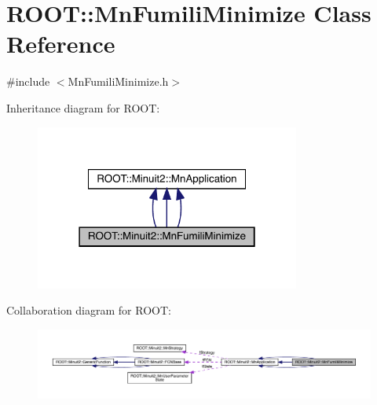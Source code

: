 \hypertarget{classROOT_1_1Minuit2_1_1MnFumiliMinimize}{}\section{R\+O\+OT\+:\+:Mn\+Fumili\+Minimize Class Reference}
\label{classROOT_1_1Minuit2_1_1MnFumiliMinimize}


{\ttfamily \#include $<$Mn\+Fumili\+Minimize.\+h$>$}



Inheritance diagram for R\+O\+OT\+:
\nopagebreak
\begin{figure}[H]
\begin{center}
\leavevmode
\includegraphics[width=247pt]{d2/d78/classROOT_1_1Minuit2_1_1MnFumiliMinimize__inherit__graph}
\end{center}
\end{figure}


Collaboration diagram for R\+O\+OT\+:
\nopagebreak
\begin{figure}[H]
\begin{center}
\leavevmode
\includegraphics[width=350pt]{dd/dcd/classROOT_1_1Minuit2_1_1MnFumiliMinimize__coll__graph}
\end{center}
\end{figure}

